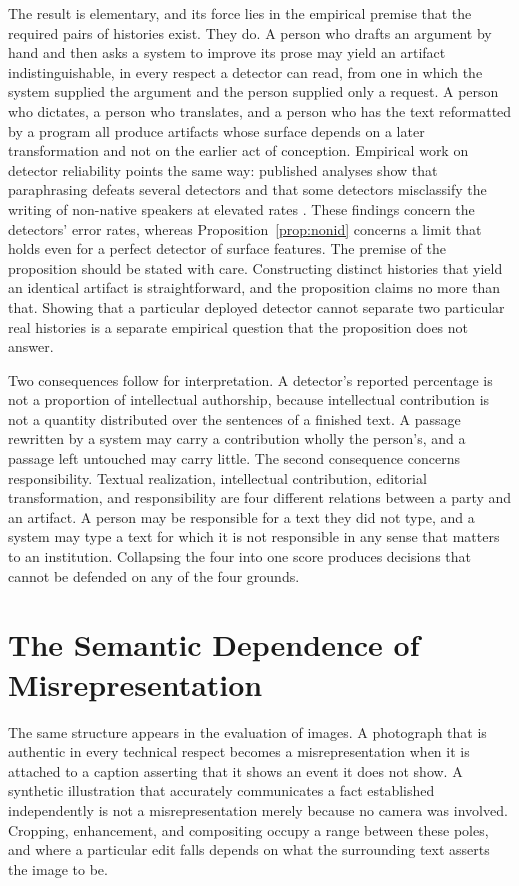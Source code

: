 \documentclass[12pt]{article}
\theoremstyle{definition}
\theoremstyle{remark}
\begin{document}
The result is elementary, and its force lies in the empirical premise that the required pairs of histories exist. They do. A person who drafts an argument by hand and then asks a system to improve its prose may yield an artifact indistinguishable, in every respect a detector can read, from one in which the system supplied the argument and the person supplied only a request. A person who dictates, a person who translates, and a person who has the text reformatted by a program all produce artifacts whose surface depends on a later transformation and not on the earlier act of conception. Empirical work on detector reliability points the same way: published analyses show that paraphrasing defeats several detectors and that some detectors misclassify the writing of non-native speakers at elevated rates \cite{sadasivan2023,liang2023}. These findings concern the detectors' error rates, whereas Proposition~\ref{prop:nonid} concerns a limit that holds even for a perfect detector of surface features. The premise of the proposition should be stated with care. Constructing distinct histories that yield an identical artifact is straightforward, and the proposition claims no more than that. Showing that a particular deployed detector cannot separate two particular real histories is a separate empirical question that the proposition does not answer.

Two consequences follow for interpretation. A detector's reported percentage is not a proportion of intellectual authorship, because intellectual contribution is not a quantity distributed over the sentences of a finished text. A passage rewritten by a system may carry a contribution wholly the person's, and a passage left untouched may carry little. The second consequence concerns responsibility. Textual realization, intellectual contribution, editorial transformation, and responsibility are four different relations between a party and an artifact. A person may be responsible for a text they did not type, and a system may type a text for which it is not responsible in any sense that matters to an institution. Collapsing the four into one score produces decisions that cannot be defended on any of the four grounds.

\section{The Semantic Dependence of Misrepresentation}

The same structure appears in the evaluation of images. A photograph that is authentic in every technical respect becomes a misrepresentation when it is attached to a caption asserting that it shows an event it does not show. A synthetic illustration that accurately communicates a fact established independently is not a misrepresentation merely because no camera was involved. Cropping, enhancement, and compositing occupy a range between these poles, and where a particular edit falls depends on what the surrounding text asserts the image to be.
\end{document}

